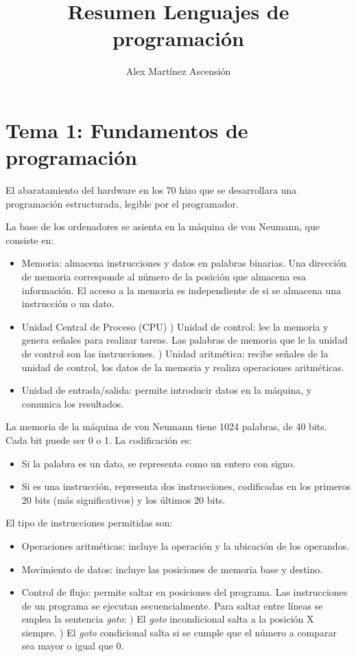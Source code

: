 \documentclass[a4paper]{article}
\title{\Huge{\vspace{-1em}Resumen Lenguajes de programación}}
\author{\Large{\vspace{-1em}Alex Mart\'inez Ascensi\'on}}
\begin{document}
	\maketitle
	
	\section{Tema 1: Fundamentos de programación}
	El abaratamiento del hardware en los 70 hizo que se desarrollara una programación estructurada, legible por el programador.
	
	La base de los ordenadores se asienta en la máquina de von Neumann, que consiste en:
	\begin{itemize}
		\item Memoria: almacena instrucciones y datos en palabras binarias. Una dirección de memoria corresponde al número de la posición que almacena esa información. El acceso a la memoria es independiente de si se almacena una instrucción o un dato.
		\item Unidad Central de Proceso (CPU)
		) Unidad de control: lee la memoria y genera señales para realizar tareas. Las palabras de memoria que le la unidad de control son las instrucciones.
		) Unidad aritmética: recibe señales de la unidad de control, los datos de la memoria y realiza operaciones aritméticas.
		\item Unidad de entrada/salida: permite introducir datos en la máquina, y comunica los resultados.
	\end{itemize}
		
	La memoria de la máquina de von Neumann tiene 1024 palabras, de 40 bits. Cada bit puede ser 0 o 1. La codificación es:
	\begin{itemize}
		\item Si la palabra es un dato, se representa como un entero con signo.
		\item Si es una instrucción, representa dos instrucciones, codificadas en los primeros 20 bits (más significativos) y los últimos 20 bits.
	\end{itemize}
	
	El tipo de instrucciones permitidas son:
	\begin{itemize}
		\item Operaciones aritméticas: incluye la operación y la ubicación de los operandos.
		\item Movimiento de datos: incluye las posiciones de memoria base y destino.
		\item Control de flujo: permite saltar en posiciones del programa. Las instrucciones de un programa se ejecutan secuencialmente. Para saltar entre líneas se emplea la sentencia \textit{goto}:
		) El \textit{goto} incondicional salta a la posición X siempre.
		) El \textit{goto} condicional salta si se cumple que el número a comparar sea mayor o igual que 0.
	\end{itemize}
	
\end{document}
